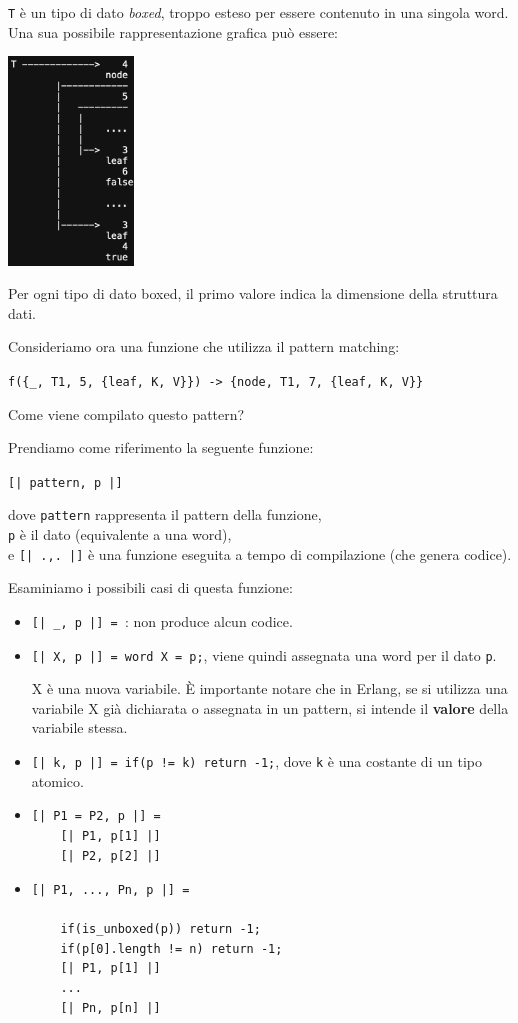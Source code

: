 \documentclass{article}
\begin{document}
\texttt{T} è un tipo di dato \textit{boxed}, troppo esteso per essere contenuto in una singola word. Una sua possibile rappresentazione grafica può essere:
\begin{center}
    \includegraphics[width=0.25\textwidth]{img/t.png}
\end{center}
Per ogni tipo di dato boxed, il primo valore indica la dimensione della struttura dati.

Consideriamo ora una funzione che utilizza il pattern matching:
\begin{center}
    \texttt{f(\{\_, T1, 5, \{leaf, K, V\}\}) -> \{node, T1, 7, \{leaf, K, V\}\}}
\end{center}
Come viene compilato questo pattern?

Prendiamo come riferimento la seguente funzione:
\begin{center}
    \texttt{[| pattern, p |]}
\end{center}
dove \texttt{pattern} rappresenta il pattern della funzione,\\
\texttt{p} è il dato (equivalente a una word),\\
e \texttt{[| .,. |]} è una funzione eseguita a tempo di compilazione (che genera codice).

Esaminiamo i possibili casi di questa funzione:
\begin{itemize}
    \item \texttt{[| \_, p |] = }: non produce alcun codice.
    \item \texttt{[| X, p |] = word X = p;}, viene quindi assegnata una word per il dato \texttt{p}.
    
    X è una nuova variabile. È importante notare che in Erlang, se si utilizza una variabile X già dichiarata o assegnata in un pattern, si intende il \textbf{valore} della variabile stessa.
    \item \texttt{[| k, p |] = if(p != k) return -1;}, dove \texttt{k} è una costante di un tipo atomico.
    \item \begin{verbatim}
[| P1 = P2, p |] =
    [| P1, p[1] |]
    [| P2, p[2] |]
\end{verbatim}
    \item \begin{verbatim}
[| P1, ..., Pn, p |] = 

    if(is_unboxed(p)) return -1;
    if(p[0].length != n) return -1;
    [| P1, p[1] |] 
    ...
    [| Pn, p[n] |]
\end{verbatim}
\vspace{5pt}
\end{itemize}
\end{document}
